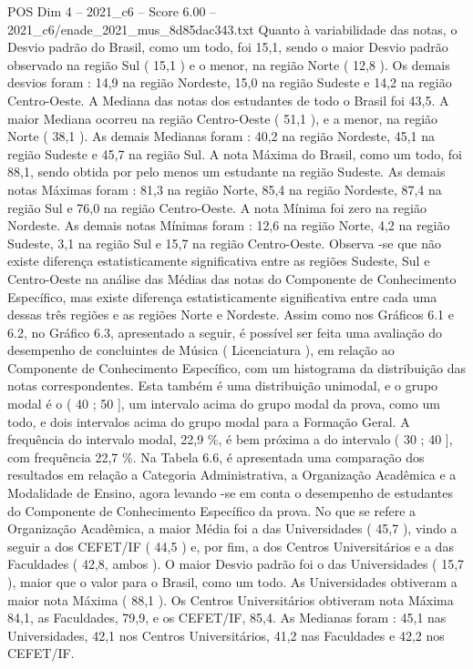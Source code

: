 \begin{textsample}{POS Dim 4 – 2021\_c6 – Score 6.00 – 2021\_c6/enade\_2021\_mus\_8d85dac343.txt}
Quanto à variabilidade das notas, o Desvio padrão do Brasil, como um todo, foi 15,1, sendo o maior Desvio padrão observado na região Sul ( 15,1 ) e o menor, na região Norte ( 12,8 ).
Os demais desvios foram : 14,9 na região Nordeste, 15,0 na região Sudeste e 14,2 na região Centro-Oeste.
A Mediana das notas dos estudantes de todo o Brasil foi 43,5.
A maior Mediana ocorreu na região Centro-Oeste ( 51,1 ), e a menor, na região Norte ( 38,1 ).
As demais Medianas foram : 40,2 na região Nordeste, 45,1 na região Sudeste e 45,7 na região Sul.
A nota Máxima do Brasil, como um todo, foi 88,1, sendo obtida por pelo menos um estudante na região Sudeste.
As demais notas Máximas foram : 81,3 na região Norte, 85,4 na região Nordeste, 87,4 na região Sul e 76,0 na região Centro-Oeste.
A nota Mínima foi zero na região Nordeste.
As demais notas Mínimas foram : 12,6 na região Norte, 4,2 na região Sudeste, 3,1 na região Sul e 15,7 na região Centro-Oeste.
Observa -se que não existe diferença estatisticamente significativa entre as regiões Sudeste, Sul e Centro-Oeste na análise das Médias das notas do Componente de Conhecimento Específico, mas existe diferença estatisticamente significativa entre cada uma dessas três regiões e as regiões Norte e Nordeste.
Assim como nos Gráficos 6.1 e 6.2, no Gráfico 6.3, apresentado a seguir, é possível ser feita uma avaliação do desempenho de concluintes de Música ( Licenciatura ), em relação ao Componente de Conhecimento Específico, com um histograma da distribuição das notas correspondentes.
Esta também é uma distribuição unimodal, e o grupo modal é o ( 40 ; 50 ], um intervalo acima do grupo modal da prova, como um todo, e dois intervalos acima do grupo modal para a Formação Geral.
A frequência do intervalo modal, 22,9 \%, é bem próxima a do intervalo ( 30 ; 40 ], com frequência 22,7 \%.
Na Tabela 6.6, é apresentada uma comparação dos resultados em relação a Categoria Administrativa, a Organização Acadêmica e a Modalidade de Ensino, agora levando -se em conta o desempenho de estudantes do Componente de Conhecimento Específico da prova.
No que se refere a Organização Acadêmica, a maior Média foi a das Universidades ( 45,7 ), vindo a seguir a dos CEFET/IF ( 44,5 ) e, por fim, a dos Centros Universitários e a das Faculdades ( 42,8, ambos ).
O maior Desvio padrão foi o das Universidades ( 15,7 ), maior que o valor para o Brasil, como um todo.
As Universidades obtiveram a maior nota Máxima ( 88,1 ).
Os Centros Universitários obtiveram nota Máxima 84,1, as Faculdades, 79,9, e os CEFET/IF, 85,4.
As Medianas foram : 45,1 nas Universidades, 42,1 nos Centros Universitários, 41,2 nas Faculdades e 42,2 nos CEFET/IF.

\end{textsample}
